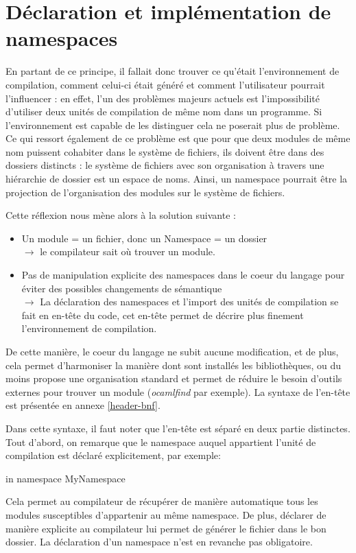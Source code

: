 \documentclass[11pt,a4paper]{report}
\begin{document}
\section{Déclaration et implémentation de namespaces}

En partant de ce principe, il fallait donc trouver ce qu'était l'environnement
de compilation, comment celui-ci était généré et comment l'utilisateur pourrait
l'influencer : en effet, l'un des problèmes majeurs actuels est l'impossibilité
d'utiliser deux unités de compilation de même nom dans un programme. Si
l'environnement est capable de les distinguer cela ne poserait plus de
problème. Ce qui ressort également de ce problème est que pour que deux modules
de même nom puissent cohabiter dans le système de fichiers, ils doivent être
dans des dossiers distincts : le système de fichiers avec son organisation à
travers une hiérarchie de dossier est un espace de noms. Ainsi, un namespace
pourrait être la projection de l'organisation des modules sur le système de
fichiers.

Cette réflexion nous mène alors à la solution suivante :
\begin{itemize}
\item Un module = un fichier, donc un Namespace = un dossier \\
  $\rightarrow$ le compilateur sait où trouver un module.
\item Pas de manipulation explicite des namespaces dans le coeur du langage pour
  éviter des possibles changements de sémantique \\
  $\rightarrow$ La déclaration des namespaces et l'import des unités de
  compilation se fait en en-tête du code, cet en-tête permet de décrire plus
  finement l'environnement de compilation.
\end{itemize}

De cette manière, le coeur du langage ne subit aucune modification, et de plus,
cela permet d'harmoniser la manière dont sont installés les bibliothèques, ou du
moins propose une organisation standard et permet de réduire le besoin d'outils
externes pour trouver un module (\emph{ocamlfind} par exemple). La syntaxe de
l'en-tête est présentée en annexe \ref{header-bnf}.


Dans cette syntaxe, il faut noter que l'en-tête est séparé en deux partie
distinctes. Tout d'abord, on remarque que le namespace auquel appartient l'unité
de compilation est déclaré explicitement, par exemple:
\begin{OCaml}
in namespace MyNamespace
\end{OCaml}
 Cela permet au compilateur de
récupérer de manière automatique tous les modules susceptibles d'appartenir au
même namespace. De plus, déclarer de manière explicite au compilateur lui permet
de générer le fichier dans le bon dossier. La déclaration d'un namespace n'est
en revanche pas obligatoire.
\end{document}

